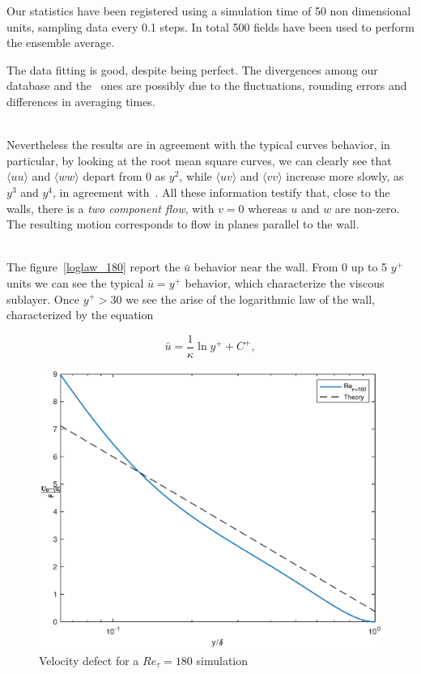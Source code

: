Our statistics have been registered using a simulation time of 50 non dimensional units, sampling data every 0.1 steps.
In total 500 fields have been used to perform the ensemble average. \par

The data fitting is good, despite being perfect. The divergences among our database and the~\cite{kim_moin_moser} ones are possibly due to the fluctuations, rounding errors and differences in averaging times.\\~\par

Nevertheless the results are in agreement with the typical curves behavior, in particular, by looking at the root mean square curves, we can clearly see that $\langle uu\rangle$ and $\langle ww\rangle$ depart from 0 as $y^{2}$, while $\langle uv\rangle$ and $\langle vv\rangle$ increase more slowly, as $y^{3}$ and $y^{4}$, in agreement with~\cite[284]{pope}.
All these information testify that, close to the walls, there is a \emph{two component flow}, with $v=0$ whereas $u$ and $w$ are non-zero. The resulting motion corresponds to flow in planes parallel to the wall. \\~\par

The figure~\ref{loglaw_180} report the $\bar{u}$ behavior near the wall. From 0 up to 5 $y^{+}$ units we can see the typical $\bar{u}=y^{+}$ behavior, which characterize the viscous sublayer. Once $y^{+}>30$ we see the arise of the logarithmic law of the wall, characterized by the equation

\begin{equation*}
\bar{u} = \frac{1}{\kappa} \ln y^{+} +C^{+},
\end{equation*}


\begin{figure}
\begin{center}
\includegraphics[scale=0.55]{grafici/velocity_defect_180.eps}
\caption{Velocity defect for a $Re_{\tau}=180$ simulation}
\label{velocity:defect:180}
\end{center} 
\end{figure}

